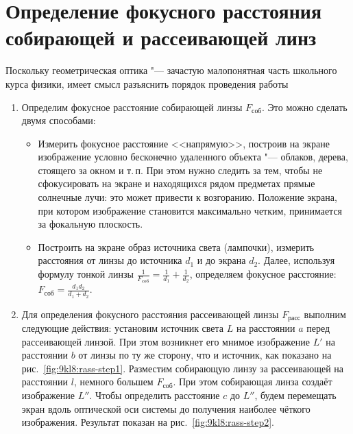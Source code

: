 \section{Определение фокусного расстояния собирающей и рассеивающей линз}
\SolveVariant
Поскольку геометрическая оптика "--- зачастую малопонятная часть школьного курса физики, имеет смысл разъяснить порядок проведения работы
\begin{enumerate}
    \item Определим фокусное расстояние собирающей линзы \(F_\text{соб}\). Это можно сделать двумя способами:
    \begin{itemize}
    	\item Измерить фокусное расстояние <<напрямую>>, построив на экране изображение условно бесконечно удаленного объекта "--- облаков, дерева, стоящего за окном и т.\,п. При этом нужно следить за тем, чтобы не сфокусировать на экране и находящихся рядом предметах прямые солнечные лучи: это может привести к возгоранию. Положение экрана, при котором изображение становится максимально четким, принимается за фокальную плоскость.
    	\item Построить на экране образ источника света (лампочки), измерить расстояния от линзы до источника \(d_1\) и до экрана \(d_2\). Далее, используя формулу тонкой линзы \(\frac{1}{F_\text{соб}} = \frac{1}{d_1} + \frac{1}{d_2}\), определяем фокусное расстояние: \(F_\text{соб}=\frac{d_1 d_2}{d_1+d_2}\).
    \end{itemize}
    \item Для определения фокусного расстояния рассеивающей линзы \(F_\text{расс}\) выполним следующие действия: установим источник света \(L\) на расстоянии \(a\) перед рассеивающей линзой. При этом возникнет его мнимое изображение \(L'\) на расстоянии \(b\) от линзы по ту же сторону, что и источник, как показано на рис.~\ref{fig:9kl8:rass-step1}. Разместим собирающую линзу за рассеивающей на расстоянии \(l\), немного большем \(F_\text{соб}\). При этом собирающая линза создаёт изображение \(L''\). Чтобы определить расстояние \(c\) до \(L''\), будем перемещать экран вдоль оптической оси системы до получения наиболее чёткого изображения. Результат показан на рис.~\ref{fig:9kl8:rass-step2}.\par
    \begin{figure}[t]
    	\parbox[b]{\textwidth}{
		    \centering
}
\end{figure}
\end{enumerate}
